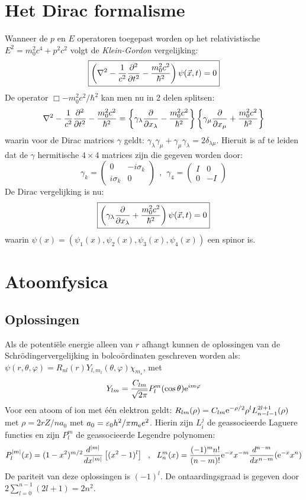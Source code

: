 \section[~~Het Dirac formalisme]{Het Dirac formalisme}
Wanneer de $p$ en $E$ operatoren toegepast worden op het relativistische
$E^2=m_0^2c^4+p^2c^2$ volgt de {\it Klein-Gordon} vergelijking:
\[
\mbox{\fbox{$\displaystyle
\left(\nabla^2-\frac{1}{c^2}\frac{\partial^2 }{\partial t^2}-\frac{m_0^2c^2}{\hbar^2}\right)\psi(\vec{x},t)=0
$}}
\]
De operator $\Box-m_0^2c^2/\hbar^2$ kan men nu in 2 delen splitsen:
\[
\nabla^2-\frac{1}{c^2}\frac{\partial^2 }{\partial t^2}-\frac{m_0^2c^2}{\hbar^2}=
\left\{\gamma_\lambda\frac{\partial }{\partial x_\lambda}-\frac{m_0^2c^2}{\hbar^2}\right\}
\left\{\gamma_\mu\frac{\partial }{\partial x_\mu}+\frac{m_0^2c^2}{\hbar^2}\right\}
\]
waarin voor de Dirac matrices $\gamma$ geldt:
$\gamma_\lambda\gamma_\mu+\gamma_\mu\gamma_\lambda=2\delta_{\lambda\mu}$.
Hieruit is af te leiden dat de $\gamma$ hermitische $4\times4$ matrices zijn
die gegeven worden door:
\[
\gamma_k=\left(\begin{array}{cc}0&-i\sigma_k\\i\sigma_k&0\end{array}\right)~~,~~
\gamma_4=\left(\begin{array}{cc}I&0\\0&-I\end{array}\right)
\]
De Dirac vergelijking is nu:
\[
\mbox{\fbox{$\displaystyle
\left(\gamma_\lambda\frac{\partial }{\partial x_\lambda}+\frac{m_0^2c^2}{\hbar^2}\right)\psi(\vec{x},t)=0
$}}
\]
waarin $\psi(x)=(\psi_1(x),\psi_2(x),\psi_3(x),\psi_4(x))$ een spinor is.

\section[~~Atoomfysica]{Atoomfysica}
\subsection[~~Oplossingen]{Oplossingen}
Als de potenti\"ele energie alleen van $r$ afhangt kunnen de oplossingen van
de Schr\"odingervergelijking in bolco\"ordinaten geschreven worden als:
$\psi(r,\theta,\varphi)=R_{nl}(r)Y_{l,m_l}(\theta,\varphi)\chi_{m_s}$, met
\[
Y_{lm}=\frac{C_{lm}}{\sqrt{2\pi}}P_l^m(\cos\theta){\rm e}^{im\varphi}
\]
Voor een atoom of ion met \'e\'en elektron geldt:
$\displaystyle
R_{lm}(\rho)=C_{lm}{\rm e}^{-\rho/2}\rho^l L_{n-l-1}^{2l+1}(\rho)$
\npar
met $\rho=2rZ/na_0$ met $a_0=\varepsilon_0 h^2/\pi m_{\rm e} e^2$. Hierin zijn
$L_i^j$ de geassocieerde Laguere functies en zijn $P_l^m$ de geassocieerde
Legendre polynomen:
\[
P_l^{|m|}(x)=(1-x^2)^{m/2}\frac{d^{|m|}}{dx^{|m|}}\left[(x^2-1)^l\right]~~,~~
L_n^m(x)=\frac{(-1)^mn!}{(n-m)!}{\rm e}^{-x}x^{-m}\frac{d^{n-m}}{dx^{n-m}}({\rm e}^{-x}x^n)
\]
De pariteit van deze oplossingen is $(-1)^l$. De ontaardingsgraad is gegeven
door $2\sum\limits_{l=0}^{n-1}(2l+1)=2n^2$.

